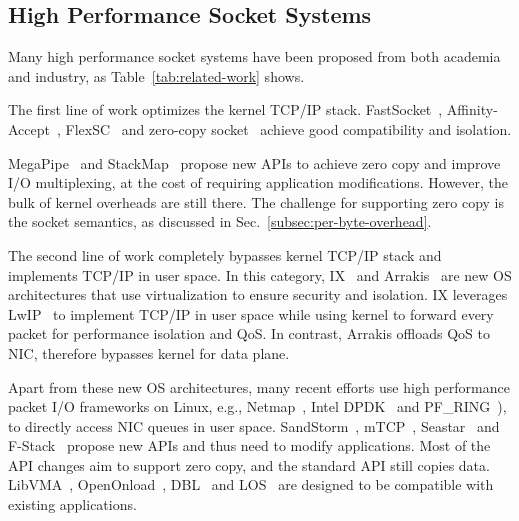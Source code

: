 


\subsection{High Performance Socket Systems}
\label{subsec:related-work}




Many high performance socket systems have been proposed from both academia and industry, as Table~\ref{tab:related-work} shows.

 The first line of work optimizes the kernel TCP/IP stack. FastSocket~\cite{lin2016scalable}, Affinity-Accept~\cite{pesterev2012improving}, FlexSC~\cite{soares2010flexsc} and zero-copy socket~\cite{thadani1995efficient,chu1996zero,linux-zero-copy} achieve good compatibility and isolation.

MegaPipe~\cite{han2012megapipe} and StackMap~\cite{yasukata2016stackmap} propose new APIs to achieve zero copy and improve I/O multiplexing, at the cost of requiring application modifications.
However, the bulk of kernel overheads are still there.
The challenge for supporting zero copy is the socket semantics, as discussed in Sec.~\ref{subsec:per-byte-overhead}.

 The second line of work completely bypasses kernel TCP/IP stack and implements TCP/IP in user space.
In this category, IX~\cite{belay2017ix} and Arrakis~\cite{peter2016arrakis} are new OS architectures that use virtualization to ensure security and isolation. IX leverages LwIP~\cite{dunkels2001design} to implement TCP/IP in user space while using kernel to forward every packet for performance isolation and QoS. In contrast, Arrakis offloads QoS to NIC, therefore bypasses kernel for data plane.%

Apart from these new OS architectures, many recent efforts use high performance packet I/O frameworks on Linux, e.g., Netmap~\cite{rizzo2012netmap}, Intel DPDK~\cite{dpdk} and PF\_RING~\cite{pf-ring}), to directly access NIC queues in user space.
SandStorm~\cite{marinos2014network}, mTCP~\cite{jeong2014mtcp}, Seastar~\cite{seastar} and F-Stack~\cite{fstack} propose new APIs and thus need to modify applications.
Most of the API changes aim to support zero copy, and the standard API still copies data.
LibVMA~\cite{libvma}, OpenOnload~\cite{openonload}, DBL~\cite{dbl} and LOS~\cite{huang2017high} are designed to be compatible with existing applications.

